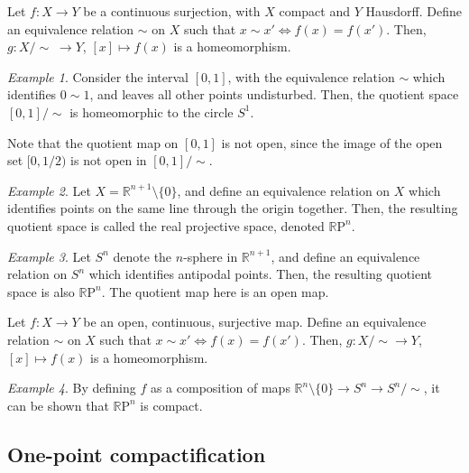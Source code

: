 \documentclass[11pt]{article}
\newcommand{\R}{\mathbb{R}}
\newcommand{\RP}{\R\mathrm{P}}
\theoremstyle{definition}
\theoremstyle{remark}
\newtheorem*{example}{Example}
\numberwithin{equation}{section}
\begin{document}
    \begin{lemma}
        Let $f\colon X \to Y$ be a continuous surjection, with $X$ compact and $Y$
        Hausdorff. Define an equivalence relation $\sim$ on $X$ such that $x\sim
        x'\Leftrightarrow f(x) = f(x')$. Then, $g\colon X/\!\sim \;\to Y$, $[x]
        \mapsto f(x)$ is a homeomorphism.
    \end{lemma}
    \begin{example}
        Consider the interval $[0, 1]$, with the equivalence relation $\sim$ which
        identifies $0 \sim 1$, and leaves all other points undisturbed. Then, the
        quotient space $[0, 1]/\!\sim$ is homeomorphic to the circle $S^1$.

        Note that the quotient map on $[0, 1]$ is not open, since the image of the
        open set $[0, 1 / 2)$ is not open in $[0, 1]/\!\sim$.
    \end{example}
    \begin{example}
        Let $X = \R^{n + 1}\setminus\{0\}$, and define an equivalence relation on $X$
        which identifies points on the same line through the origin together. Then,
        the resulting quotient space is called the real projective space, denoted
        $\RP^n$.
    \end{example}
    \begin{example}
        Let $S^n$ denote the $n$-sphere in $\R^{n + 1}$, and define an equivalence
        relation on $S^n$ which identifies antipodal points. Then, the resulting
        quotient space is also $\RP^n$. The quotient map here is an open map.
    \end{example}

    \begin{lemma}
        Let $f\colon X \to Y$ be an open, continuous, surjective map. Define an
        equivalence relation $\sim$ on $X$ such that $x \sim x' \Leftrightarrow
        f(x) = f(x')$. Then, $g\colon X/\!\sim \to Y$, $[x] \mapsto f(x)$ is a
        homeomorphism.
    \end{lemma}
    \begin{example}
        By defining $f$ as a composition of maps $\R^n\setminus\{0\} \to S^n \to
        S^n/\!\sim$, it can be shown that $\RP^n$ is compact.
    \end{example}


    \subsection{One-point compactification}
\end{document}
